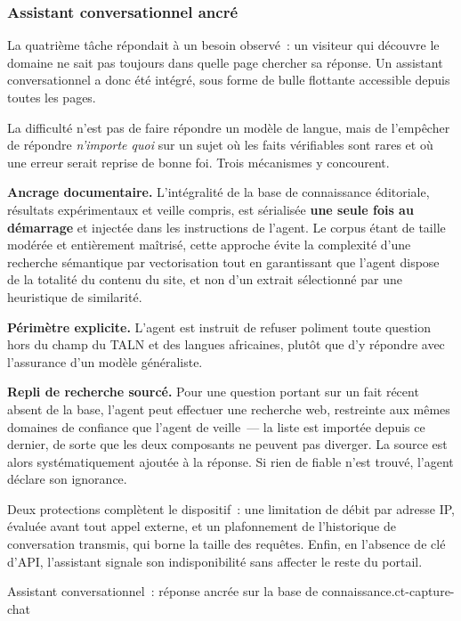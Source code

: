 \subsubsection{Assistant conversationnel ancré}
\label{ssec:ct-chat}

La quatrième tâche répondait à un besoin observé~: un visiteur qui découvre le domaine
ne sait pas toujours dans quelle page chercher sa réponse. Un assistant
conversationnel a donc été intégré, sous forme de bulle flottante accessible depuis
toutes les pages.

La difficulté n'est pas de faire répondre un modèle de langue, mais de l'empêcher de
répondre \textit{n'importe quoi} sur un sujet où les faits vérifiables sont rares et
où une erreur serait reprise de bonne foi. Trois mécanismes y concourent.

\textbf{Ancrage documentaire.} L'intégralité de la base de connaissance éditoriale,
résultats expérimentaux et veille compris, est sérialisée \textbf{une seule fois au
	démarrage} et injectée dans les instructions de l'agent. Le corpus étant de taille
modérée et entièrement maîtrisé, cette approche évite la complexité d'une recherche
sémantique par vectorisation tout en garantissant que l'agent dispose de la totalité
du contenu du site, et non d'un extrait sélectionné par une heuristique de similarité.

\textbf{Périmètre explicite.} L'agent est instruit de refuser poliment toute question
hors du champ du TALN et des langues africaines, plutôt que d'y répondre avec
l'assurance d'un modèle généraliste.

\textbf{Repli de recherche sourcé.} Pour une question portant sur un fait récent absent
de la base, l'agent peut effectuer une recherche web, restreinte aux mêmes domaines de
confiance que l'agent de veille~--- la liste est importée depuis ce dernier, de sorte
que les deux composants ne peuvent pas diverger. La source est alors systématiquement
ajoutée à la réponse. Si rien de fiable n'est trouvé, l'agent déclare son ignorance.

Deux protections complètent le dispositif~: une limitation de débit par adresse IP,
évaluée avant tout appel externe, et un plafonnement de l'historique de conversation
transmis, qui borne la taille des requêtes. Enfin, en l'absence de clé d'API,
l'assistant signale son indisponibilité sans affecter le reste du portail.

{Assistant conversationnel~: réponse ancrée sur la base de connaissance.}{ct-capture-chat}


